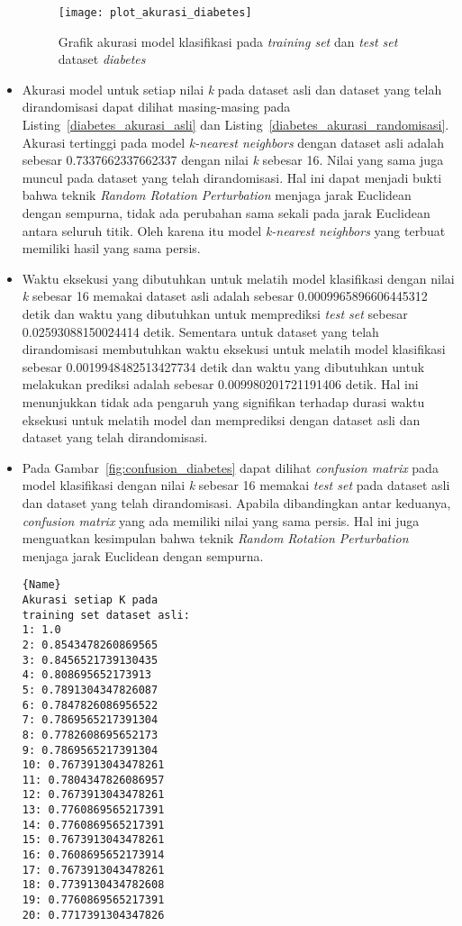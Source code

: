 \begin{itemize}
	\begin{figure}
		\centering
		\texttt{[image: plot\_akurasi\_diabetes]}
		\caption{Grafik akurasi model klasifikasi pada \textit{training set} dan \textit{test set} dataset \textit{diabetes}}
		\label{fig:plot_akurasi_diabetes}
	\end{figure}
	\item Akurasi model untuk setiap nilai \textit{k} pada dataset asli dan dataset yang telah dirandomisasi dapat dilihat masing-masing pada Listing~\ref{diabetes_akurasi_asli} dan Listing~\ref{diabetes_akurasi_randomisasi}. Akurasi tertinggi pada model \textit{k-nearest neighbors} dengan dataset asli adalah sebesar 0.7337662337662337 dengan nilai \textit{k} sebesar 16. Nilai yang sama juga muncul pada dataset yang telah dirandomisasi. Hal ini dapat menjadi bukti bahwa teknik \textit{Random Rotation Perturbation} menjaga jarak Euclidean dengan sempurna, tidak ada perubahan sama sekali pada jarak Euclidean antara seluruh titik. Oleh karena itu model \textit{k-nearest neighbors} yang terbuat memiliki hasil yang sama persis.
	\item Waktu eksekusi yang dibutuhkan untuk melatih model klasifikasi dengan nilai \textit{k} sebesar 16 memakai dataset asli adalah sebesar 0.0009965896606445312 detik dan waktu yang dibutuhkan untuk memprediksi \textit{test set} sebesar 0.02593088150024414 detik. Sementara untuk dataset yang telah dirandomisasi membutuhkan waktu eksekusi untuk melatih model klasifikasi sebesar 0.0019948482513427734 detik dan waktu yang dibutuhkan untuk melakukan prediksi adalah sebesar 0.009980201721191406 detik. Hal ini menunjukkan tidak ada pengaruh yang signifikan terhadap durasi waktu eksekusi untuk melatih model dan memprediksi dengan dataset asli dan dataset yang telah dirandomisasi.
	\item Pada Gambar~\ref{fig:confusion_diabetes} dapat dilihat \textit{confusion matrix} pada model klasifikasi dengan nilai \textit{k} sebesar 16 memakai \textit{test set} pada dataset asli dan dataset yang telah dirandomisasi. Apabila dibandingkan antar keduanya, \textit{confusion matrix} yang ada memiliki nilai yang sama persis. Hal ini juga menguatkan kesimpulan bahwa teknik \textit{Random Rotation Perturbation} menjaga jarak Euclidean dengan sempurna.

	\noindent\begin{minipage}{.44\textwidth}
		\begin{lstlisting}[caption=Akurasi Dataset Asli,frame=tlrb, label=diabetes_akurasi_asli]{Name}
Akurasi setiap K pada 
training set dataset asli: 
1: 1.0
2: 0.8543478260869565
3: 0.8456521739130435
4: 0.808695652173913
5: 0.7891304347826087
6: 0.7847826086956522
7: 0.7869565217391304
8: 0.7782608695652173
9: 0.7869565217391304
10: 0.7673913043478261
11: 0.7804347826086957
12: 0.7673913043478261
13: 0.7760869565217391
14: 0.7760869565217391
15: 0.7673913043478261
16: 0.7608695652173914
17: 0.7673913043478261
18: 0.7739130434782608
19: 0.7760869565217391
20: 0.7717391304347826


\end{lstlisting}
\end{minipage}
\end{itemize}
